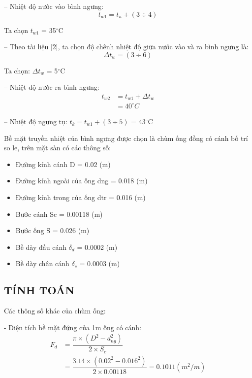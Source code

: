 -- Nhiệt độ nước vào bình ngưng:
\begin{equation*}
	t_{w1} = t_{u} + (3\div 4)
\end{equation*}

Ta chọn $t_{w1}$ = 35$^{\circ}$C

-- Theo tài liệu [2], ta chọn độ chênh nhiệt độ giữa nước vào và ra bình ngưng là: 
\begin{equation*}
	\Delta t_{w} = (3\div 6)
\end{equation*}

Ta chọn: $\Delta t_{w}$ = 5$^{\circ}$C

-- Nhiệt độ nước ra bình ngưng:
\begin{equation*}
	\begin{split}
		 t_{w2} &= t_{w1} + \Delta t_{w} \\
		 &= 40^{\circ}C
	\end{split}
\end{equation*}

-- Nhiệt độ ngưng tụ: $t_{k} = t_{w1} + (3\div 5)$ =  43$^{\circ}$C

Bề mặt truyền nhiệt của bình ngưng được chọn là chùm ống đồng có cánh bố trí so le, trên mặt sàn có các thông số:
\begin{itemize}
	\item Đường kính cánh D = 0.02 (m)
	\item Đường kính ngoài của ống d{\scriptsize ng} = 0.018 (m)
	\item Đường kính trong của ống d{\scriptsize tr} = 0.016 (m)
	\item Bước cánh S{\scriptsize c} = 0.00118 (m)
	\item Bước ống S = 0.026 (m)
	\item Bề dày đầu cánh $\delta_{d}$ = 0.0002 (m)
	\item Bề dày chân cánh $\delta_{c}$ = 0.0003 (m)
\end{itemize}

\subsection{TÍNH TOÁN}
Các thông số khác của chùm ống:

- Diện tích bề mặt đứng của 1m ống có cánh:
\begin{equation*}
	\begin{split}
		F_{d} &= \dfrac{\pi\times (D^2 - d^2_{ng})}{2\times S_{c}}\\
		&=\dfrac{3.14 \times (0.02^2 - 0.016^2)}{2 \times 0.00118} = 0.1011(m^2/m)
	\end{split}
\end{equation*}

